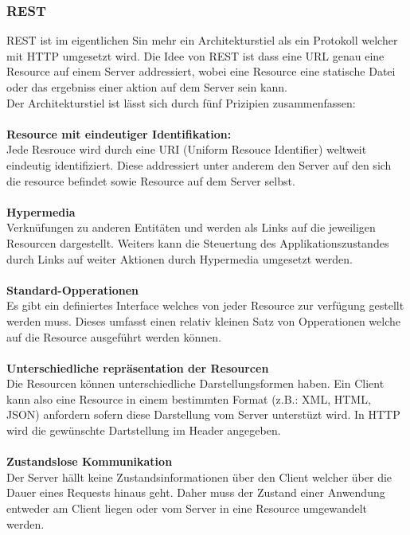 \subsubsection{REST}
\label{sec:HTTP}
REST ist im eigentlichen Sin mehr ein Architekturstiel als ein Protokoll welcher mit HTTP umgesetzt wird.
Die Idee von REST ist dass eine URL genau eine Resource auf einem Server addressiert, 
wobei eine Resource eine statische Datei oder das ergebniss einer aktion auf dem Server sein kann.
\\
Der Architekturstiel ist lässt sich durch fünf Prizipien zusammenfassen:
\\
\\
\textbf{Resource mit eindeutiger Identifikation:}\\
Jede Resrouce wird durch eine URI (Uniform Resouce Identifier) weltweit eindeutig identifiziert.
Diese addressiert unter anderem den Server auf den sich die resource befindet sowie Resource auf dem Server selbst.
\\
\\
\textbf{Hypermedia}\\
Verknüfungen zu anderen Entitäten und werden als Links auf die jeweiligen Resourcen dargestellt.
Weiters kann die Steuertung des Applikationszustandes durch Links auf weiter Aktionen durch Hypermedia umgesetzt werden.
\\
\\
\textbf{Standard-Opperationen}\\
Es gibt ein definiertes Interface welches von jeder Resource zur verfügung gestellt werden muss.
Dieses umfasst einen relativ kleinen Satz von Opperationen welche auf die Resource ausgeführt werden können.
\\
\\
\textbf{Unterschiedliche repräsentation der Resourcen}\\
Die Resourcen können unterschiedliche Darstellungsformen haben.
Ein Client kann also eine Resource in einem bestimmten Format (z.B.: XML, HTML, JSON) anfordern sofern diese Darstellung vom Server unterstüzt wird.
In HTTP wird die gewünschte Dartstellung im Header angegeben.
\\
\\
\textbf{Zustandslose Kommunikation}\\
Der Server hällt keine Zustandsinformationen über den Client welcher über die Dauer eines Requests hinaus geht.
Daher muss der Zustand einer Anwendung entweder am Client liegen oder vom Server in eine Resource umgewandelt werden.
